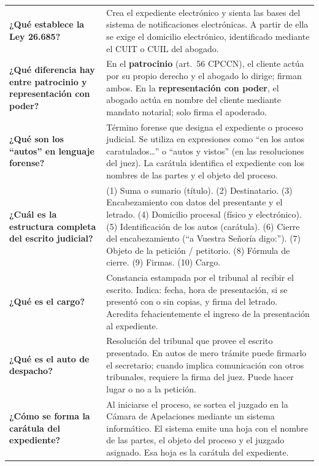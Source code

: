 \documentclass[12pt,oneside]{book}
\begin{document}
\begin{table}[H]
\begin{tabularx}{\textwidth}{
    >{\raggedright\arraybackslash}p{}
    >{\raggedright\arraybackslash}X
}
\textbf{¿Qué establece la Ley 26.685?} &
Crea el expediente electrónico y sienta las bases del sistema de notificaciones electrónicas. A partir de ella se exige el domicilio electrónico, identificado mediante el CUIT o CUIL del abogado. \\[6pt]

\textbf{¿Qué diferencia hay entre patrocinio y representación con poder?} &
En el \textbf{patrocinio} (art.\ 56 CPCCN), el cliente actúa por su propio derecho y el abogado lo dirige; firman ambos. En la \textbf{representación con poder}, el abogado actúa en nombre del cliente mediante mandato notarial; solo firma el apoderado. \\[6pt]

\textbf{¿Qué son los ``autos'' en lenguaje forense?} &
Término forense que designa el expediente o proceso judicial. Se utiliza en expresiones como ``en los autos caratulados\ldots'' o ``autos y vistos'' (en las resoluciones del juez). La carátula identifica el expediente con los nombres de las partes y el objeto del proceso. \\[6pt]

\textbf{¿Cuál es la estructura completa del escrito judicial?} &
(1) Suma o sumario (título). (2) Destinatario. (3) Encabezamiento con datos del presentante y el letrado. (4) Domicilio procesal (físico y electrónico). (5) Identificación de los autos (carátula). (6) Cierre del encabezamiento (``a Vuestra Señoría digo:''). (7) Objeto de la petición / petitorio. (8) Fórmula de cierre. (9) Firmas. (10) Cargo. \\[6pt]

\textbf{¿Qué es el cargo?} &
Constancia estampada por el tribunal al recibir el escrito. Indica: fecha, hora de presentación, si se presentó con o sin copias, y firma del letrado. Acredita fehacientemente el ingreso de la presentación al expediente. \\[6pt]

\textbf{¿Qué es el auto de despacho?} &
Resolución del tribunal que provee el escrito presentado. En autos de mero trámite puede firmarlo el secretario; cuando implica comunicación con otros tribunales, requiere la firma del juez. Puede hacer lugar o no a la petición. \\[6pt]

\textbf{¿Cómo se forma la carátula del expediente?} &
Al iniciarse el proceso, se sortea el juzgado en la Cámara de Apelaciones mediante un sistema informático. El sistema emite una hoja con el nombre de las partes, el objeto del proceso y el juzgado asignado. Esa hoja es la carátula del expediente. \\[6pt]


\end{tabularx}
\end{table}
\end{document}
